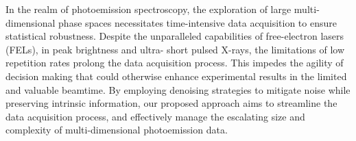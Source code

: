In the realm of photoemission spectroscopy, the exploration of large multi-dimensional phase spaces necessitates time-intensive data acquisition to ensure statistical robustness. Despite the unparalleled capabilities of free-electron lasers (FELs), in peak brightness and ultra- short pulsed X-rays, the limitations of low repetition rates prolong the data acquisition process. This impedes the agility of decision making that could otherwise enhance experimental results in the limited and valuable beamtime. By employing denoising strategies to mitigate noise while preserving intrinsic information, our proposed approach aims to streamline the data acquisition process, and effectively manage the escalating size and complexity of multi-dimensional photoemission data.